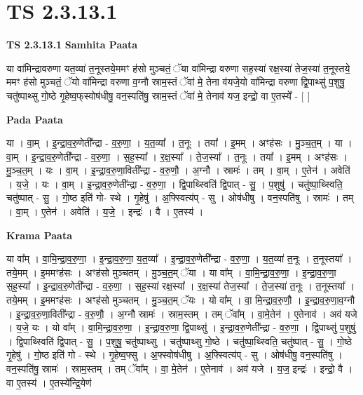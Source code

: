 \documentclass[17pt]{extarticle}
\begin{document}
\section*{ TS 2.3.13.1 }

\textbf{TS 2.3.13.1 } \newline
\textbf{Samhita Paata} \newline

या वा॑मिन्द्रावरुणा यत॒व्या॑ त॒नूस्तये॒ममꣳ ह॑सो मुञ्चतं॒ ॅया वा॑मिन्द्रा वरुणा सह॒स्या॑ रक्ष॒स्या॑ तेज॒स्या॑ त॒नूस्तये॒ ममꣳ ह॑सो मुञ्चतं॒ ॅयो वा॑मिन्द्रा वरुणा व॒ग्नौ स्राम॒स्तं ॅवा॑ मे॒ तेना व॑यजे॒यो वा॑मिन्द्रा वरुणा द्वि॒पाथ्सु॑ प॒शुषु॒ चतु॑ष्पाथ्सु गो॒ष्ठे गृ॒हेष्व॒फ्‌स्वोष॑धीषु॒ वन॒स्पति॑षु॒ स्राम॒स्तं ॅवा॑ मे॒ तेनाव॑ यज॒ इन्द्रो॒ वा ए॒तस्ये᳚ - [  ] \newline

\textbf{Pada Paata} \newline

या । वा॒म् । इ॒न्द्रा॒व॒रु॒णेती᳚न्द्रा - व॒रु॒णा॒ । य॒त॒व्या᳚ । त॒नूः । तया᳚ । इ॒मम् । अꣳह॑सः । मु॒ञ्च॒त॒म् । या । वा॒म् । इ॒न्द्रा॒व॒रु॒णेती᳚न्द्रा - व॒रु॒णा॒ । स॒ह॒स्या᳚ । र॒क्ष॒स्या᳚ । ते॒ज॒स्या᳚ । त॒नूः । तया᳚ । इ॒मम् । अꣳह॑सः । मु॒ञ्च॒त॒म् ।  यः । वा॒म् । इ॒न्द्रा॒व॒रु॒णा॒विती᳚न्द्रा - व॒रु॒णौ॒ । अ॒ग्नौ । स्रामः॑ । तम् । वा॒म् । ए॒तेन॑ । अवेति॑ । य॒जे॒ । यः । वा॒म् । इ॒न्द्रा॒व॒रु॒णेती᳚न्द्रा - व॒रु॒णा॒ । द्वि॒पाथ्स्विति॑ द्वि॒पात् - सु॒ । प॒शुषु॑ । चतु॑ष्पा॒थ्स्विति॒ चतु॑ष्पात् - सु॒ । गो॒ष्ठ इति॑ गो- स्थे । गृ॒हेषु॑ । अ॒फ्स्वित्य॑प् - सु । ओष॑धीषु । वन॒स्पति॑षु । स्रामः॑ । तम् । वा॒म् । ए॒तेन॑ । अवेति॑ । य॒जे॒ । इन्द्रः॑ । वै । ए॒तस्य॑ ।  \newline


\textbf{Krama Paata} \newline

या वा᳚म् । वा॒मि॒न्द्रा॒व॒रु॒णा॒ । इ॒न्द्रा॒व॒रु॒णा॒ य॒त॒व्या᳚ । इ॒न्द्रा॒व॒रु॒णेती᳚न्द्रा - व॒रु॒णा॒ । य॒त॒व्या॑ त॒नूः । त॒नूस्तया᳚ । तये॒मम् । इ॒ममꣳह॑सः । अꣳह॑सो मुञ्चतम् । मु॒ञ्च॒त॒म् ॅया । या वा᳚म् । वा॒मि॒न्द्रा॒व॒रु॒णा॒ । इ॒न्द्रा॒व॒रु॒णा॒ स॒ह॒स्या᳚ । इ॒न्द्रा॒व॒रु॒णेती᳚न्द्रा - व॒रु॒णा॒ । स॒ह॒स्या॑ रक्ष॒स्या᳚ । र॒क्ष॒स्या॑ तेज॒स्या᳚ । ते॒ज॒स्या॑ त॒नूः । त॒नूस्तया᳚ । तये॒मम् । इ॒ममꣳह॑सः । अꣳह॑सो मुञ्चतम् । मु॒ञ्च॒त॒म् ॅयः । यो वा᳚म् । वा॒ मि॒न्द्रा॒व॒रु॒णौ॒ । इ॒न्द्रा॒व॒रु॒णा॒व॒ग्नौ । इ॒न्द्रा॒व॒रु॒णा॒विती᳚न्द्रा - व॒रु॒णौ॒ । अ॒ग्नौ स्रामः॑ । स्राम॒स्तम् । तम् ॅवा᳚म् । वा॒मे॒तेन॑ । ए॒तेनाव॑ । अव॑ यजे । य॒जे॒ यः । यो वा᳚म् । वा॒मि॒न्द्रा॒व॒रु॒णा॒ । इ॒न्द्रा॒व॒रु॒णा॒ द्वि॒पाथ्सु॑ । इ॒न्द्रा॒व॒रु॒णेती᳚न्द्रा - व॒रु॒णा॒ । द्वि॒पाथ्सु॑ प॒शुषु॑ । द्वि॒पाथ्स्विति॑ द्वि॒पात् - सु॒ । प॒शुषु॒ चतु॑ष्पाथ्सु । चतु॑ष्पाथ्सु गो॒ष्ठे । चतु॑ष्पा॒थ्स्विति॒ चतु॑ष्पात् - सु॒ । गो॒ष्ठे गृ॒हेषु॑ । गो॒ष्ठ इति॑ गो - स्थे । गृ॒हेष्व॒फ्सु । अ॒फ्स्वोष॑धीषु । अ॒फ्स्वित्य॑प् - सु । ओष॑धीषु॒ वन॒स्पति॑षु । वन॒स्पति॑षु॒ स्रामः॑ । स्राम॒स्तम् । तम् ॅवा᳚म् । वा॒ मे॒तेन॑ । ए॒तेनाव॑ । अव॑ यजे । य॒ज॒ इन्द्रः॑ । इन्द्रो॒ वै । वा ए॒तस्य॑ । ए॒तस्ये᳚न्द्रि॒येण॑ \newline
\end{document}
